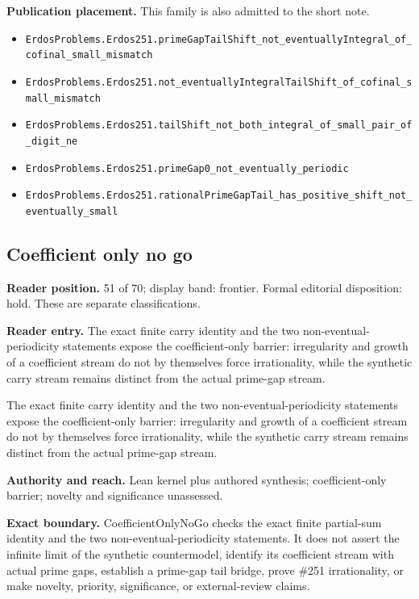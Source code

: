 \documentclass[11pt]{article}
\begin{document}
\textbf{Publication placement.} This family is also admitted to the short note.

\begin{itemize}
  \item \nolinkurl{ErdosProblems.Erdos251.primeGapTailShift_not_eventuallyIntegral_of_cofinal_small_mismatch}
  \item \nolinkurl{ErdosProblems.Erdos251.not_eventuallyIntegralTailShift_of_cofinal_small_mismatch}
  \item \nolinkurl{ErdosProblems.Erdos251.tailShift_not_both_integral_of_small_pair_of_digit_ne}
  \item \nolinkurl{ErdosProblems.Erdos251.primeGap0_not_eventually_periodic}
  \item \nolinkurl{ErdosProblems.Erdos251.rationalPrimeGapTail_has_positive_shift_not_eventually_small}
\end{itemize}

\subsection{Coefficient only no go}
\textbf{Reader position.} 51 of 70; display band: frontier.  Formal editorial disposition: hold.  These are separate classifications.

\textbf{Reader entry.} The exact finite carry identity and the two non-eventual-periodicity statements expose the coefficient-only barrier: irregularity and growth of a coefficient stream do not by themselves force irrationality, while the synthetic carry stream remains distinct from the actual prime-gap stream.

The exact finite carry identity and the two non-eventual-periodicity statements expose the coefficient-only barrier: irregularity and growth of a coefficient stream do not by themselves force irrationality, while the synthetic carry stream remains distinct from the actual prime-gap stream.

\textbf{Authority and reach.} Lean kernel plus authored synthesis; coefficient-only barrier; novelty and significance unassessed.

\textbf{Exact boundary.} CoefficientOnlyNoGo checks the exact finite partial-sum identity and the two non-eventual-periodicity statements. It does not assert the infinite limit of the synthetic countermodel, identify its coefficient stream with actual prime gaps, establish a prime-gap tail bridge, prove \#251 irrationality, or make novelty, priority, significance, or external-review claims.
\end{document}
